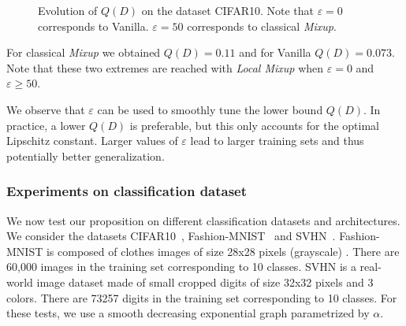 \documentclass[twoside]{article}
\numberwithin{intassumption}{assumption}
\begin{document}
\begin{figure}[h!]
    \centering
{}
    \caption{Evolution of $Q(D)$ on the dataset CIFAR10. Note that $\varepsilon = 0$ corresponds to Vanilla. $\varepsilon = 50$ corresponds to classical \emph{Mixup}.}
     \label{fig:evolutionofds}
\end{figure}
For classical \emph{Mixup} we obtained $Q(D) = 0.11$ and for Vanilla $Q(D) = 0.073$. Note that these two extremes are reached with \emph{Local Mixup} when $\varepsilon = 0$ and  $\varepsilon \geq 50$.

We observe that $\varepsilon$ can be used to smoothly tune the lower bound $Q(D)$. In practice, a lower $Q(D)$ is preferable, but this only accounts for the optimal Lipschitz constant. Larger values of $\varepsilon$ lead to larger training sets and thus potentially better generalization.

\subsubsection{Experiments on classification dataset}

We now test our proposition on different classification datasets and architectures.  We consider the datasets CIFAR10~\citep{Cifar10}, Fashion-MNIST~\citep{Fashion} and SVHN~\citep{svhn}. Fashion-MNIST is composed of clothes images of size 28x28 pixels (grayscale) . There are 60,000 images in the training set corresponding to 10 classes. SVHN is a real-world image dataset made of small cropped digits of size 32x32 pixels and 3 colors. There are 73257 digits in the training set corresponding to 10 classes. For these tests, we use a smooth decreasing exponential graph parametrized by $\alpha$.
\end{document}
